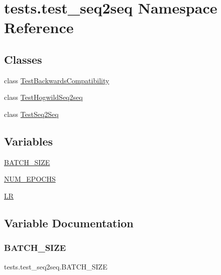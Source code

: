 \hypertarget{namespacetests_1_1test__seq2seq}{}\section{tests.\+test\+\_\+seq2seq Namespace Reference}
\label{namespacetests_1_1test__seq2seq}
\subsection*{Classes}
\begin{DoxyCompactItemize}
\item 
class \hyperlink{classtests_1_1test__seq2seq_1_1TestBackwardsCompatibility}{Test\+Backwards\+Compatibility}
\item 
class \hyperlink{classtests_1_1test__seq2seq_1_1TestHogwildSeq2seq}{Test\+Hogwild\+Seq2seq}
\item 
class \hyperlink{classtests_1_1test__seq2seq_1_1TestSeq2Seq}{Test\+Seq2\+Seq}
\end{DoxyCompactItemize}
\subsection*{Variables}
\begin{DoxyCompactItemize}
\item 
\hyperlink{namespacetests_1_1test__seq2seq_a6c3f0dca996161de4622595106a914e7}{B\+A\+T\+C\+H\+\_\+\+S\+I\+ZE}
\item 
\hyperlink{namespacetests_1_1test__seq2seq_a72c80bb8173776a11f96dc792ebad2d7}{N\+U\+M\+\_\+\+E\+P\+O\+C\+HS}
\item 
\hyperlink{namespacetests_1_1test__seq2seq_a803ab329f6b620b26b10b1a7d66bc6f6}{LR}
\end{DoxyCompactItemize}


\subsection{Variable Documentation}
\mbox{\label{namespacetests_1_1test__seq2seq_a6c3f0dca996161de4622595106a914e7}} 
\subsubsection{\texorpdfstring{B\+A\+T\+C\+H\+\_\+\+S\+I\+ZE}{BATCH\_SIZE}}
{\footnotesize\ttfamily tests.\+test\+\_\+seq2seq.\+B\+A\+T\+C\+H\+\_\+\+S\+I\+ZE}



